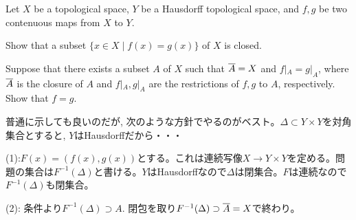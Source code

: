\begin{egprob}
Let $X$ be a topological space, $Y$ be a Hausdorff topological space, and $f,g$ be two contenuous maps from $X$ to $Y$.
\ben
\item Show that a subset $\{ x\in X \mid f(x) = g(x) \}$ of $X$ is closed.
\item Suppose that there exists a subset $A$ of $X$ such that $\overline{A} = X$ and $f|_{A} = g|_{A}$, where $\overline{A}$ is the closure of $A$ and $f|_{A}, g|_{A}$ are the restrictions of $f,g$ to $A$, respectively. Show that $f=g$.
\een
\end{egprob}
\begin{screen}
普通に示しても良いのだが, 次のような方針でやるのがベスト。$\Delta\subset Y\times Y$を対角集合とすると, $Y$はHausdorffだから・・・
\end{screen}
\begin{egans}
(1):$F(x) = (f(x),g(x))$とする。これは連続写像$X\to Y\times Y$を定める。問題の集合は$F^{-1}(\Delta)$と書ける。$Y$はHausdorffなので$\Delta$は閉集合。$F$は連続なので$F^{-1}(\Delta)$も閉集合。

(2): 条件より$F^{-1}(\Delta) \supset A$.  閉包を取り$F^{-1}(\Delta) \supset \overline{A} = X$で終わり。
\end{egans}




\clearpage
